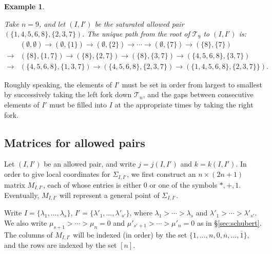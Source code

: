 \documentclass[12pt]{amsart}
\newtheorem{example}[definition]{Example}
\newcommand{\cT}{\mathcal{T}}
\newcommand{\barn}{\overline{n}}
\begin{document}
\begin{example}\label{eg:tree_path}

Take $n=9$, and let $(I,I')$ be the saturated allowed pair $(\{1,4,5,6,8\},\{2,3,7\})$. The unique path from the root of $\cT_9$ to $(I,I')$ is:
\begin{align*}
    &(\emptyset,\emptyset) \to (\emptyset,\{1\})\to (\emptyset,\{2\})\to \cdots\to (\emptyset,\{7\}) \to (\{8\},\{7\})\\
    \to& (\{8\},\{1,7\})\to (\{8\},\{2,7\})\to (\{8\},\{3,7\}) \to (\{4,5,6,8\},\{3,7\})  \\
    \to& (\{4,5,6,8\},\{1,3,7\}) \to (\{4,5,6,8\},\{2,3,7\}) \to (\{1,4,5,6,8\},\{2,3,7\}\}).
\end{align*}  
\end{example}

Roughly speaking, the elements of $I'$ must be set in order from largest to smallest by successively taking the left fork down $\cT_n$, and the gaps between consecutive elements of $I'$ must be filled into $I$ at the appropriate times by taking the right fork.

\subsection{Matrices for allowed pairs}\label{sec:matrices}
 
Let $(I,I')$ be an allowed pair, and write $j=j(I,I')$ and $k=k(I,I')$. In order to give local coordinates for $\Sigma_{I,I'}$, we first construct an $n\times (2n+1)$ matrix $M_{I,I'}$, each of whose entries is either 0 or one of the symbols $*,+,1$. Eventually, $M_{I,I'}$ will represent a general point of $\Sigma_{I,I'}$. 

Write $I = \{\lambda_1, \ldots, \lambda_s\}$, $I' = \{\lambda'_1, \ldots, \lambda'_{s'}\}$, where $\lambda_1>\cdots>\lambda_s$ and $\lambda'_1>\cdots>\lambda'_{s'}$. We also write $\mu_{s+1}>\cdots>\mu_n=0$ and $\mu'_{s'+1}>\cdots>\mu'_n=0$ as in \S\ref{sec:schubert}. The columns of $M_{I,I'}$ will be indexed (in order) by the set $\{1,\ldots,n,0,\barn,\ldots,\bar1\}$, and the rows are indexed by the set $[n]$. 
\end{document}
